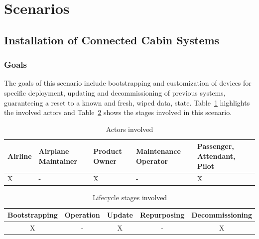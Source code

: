 \section{Scenarios}
\subsection{Installation of Connected Cabin Systems} %
\label{sub:Installation of Connected Cabin Systems}

\subsubsection{Goals}

The goals of this scenario include bootstrapping and customization of devices for specific deployment, updating and
decommissioning of previous systems, guaranteeing a reset to a known and fresh, wiped data, state.
Table~\ref{tab:Actors involved} highlights the involved actors and Table~\ref{tab:Lifecycle stages involved} shows the
stages involved in this scenario.

\begin{table}
	\caption{Actors involved}
	\label{tab:Actors involved}
	\begin{center}
		\begin{tabular}{ |p{2.5cm}|p{2.5cm}|p{2.5cm}|p{2.5cm}|p{2.5cm}| }
			\hline
			Airline & Airplane Maintainer & Product Owner & Maintenance Operator & Passenger, Attendant, Pilot \\
			\hline
			X       & -                   & X             & -                    & X                           \\
			\hline
		\end{tabular}
	\end{center}
\end{table}

\begin{table}
	\caption{Lifecycle stages involved}
	\label{tab:Lifecycle stages involved}
	\begin{center}
		\begin{tabular}{ |c|c|c|c|c| }
			\hline
			Bootstrapping & Operation & Update & Repurposing & Decommissioning \\
			\hline
			X             & -         & X      & -           & X               \\
			\hline
		\end{tabular}
	\end{center}
\end{table}



